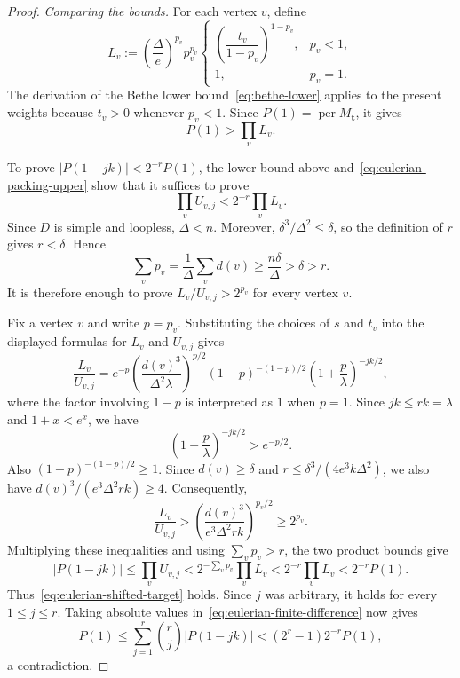 \documentclass[10pt,a4paper]{amsart}
\newcommand{\per}{\operatorname{per}}
\begin{document}
\begin{proof}
\medskip\noindent
\emph{Comparing the bounds.}
For each vertex $v$, define
\[
  L_v:=
  \left(\frac{\Delta}{e}\right)^{p_v}p_v^{p_v}
  \begin{cases}
    \left(\dfrac{t_v}{1-p_v}\right)^{1-p_v},&p_v<1,\\[1.2ex]
    1,&p_v=1.
  \end{cases}
\]
The derivation of the Bethe lower bound~\eqref{eq:bethe-lower} applies
to the present weights because $t_v>0$ whenever $p_v<1$.  Since
$P(1)=\per M_{\mathbf t}$, it gives
\[
  P(1)>\prod_vL_v.
\]

To prove $|P(1-jk)|<2^{-r}P(1)$, the lower bound above
and~\eqref{eq:eulerian-packing-upper} show that it suffices to prove
\[
  \prod_vU_{v,j}<2^{-r}\prod_vL_v.
\]
Since $D$ is simple and loopless, $\Delta<n$.  Moreover,
$\delta^3/\Delta^2\le\delta$, so the definition of $r$ gives
$r<\delta$.  Hence
\[
  \sum_vp_v
  =\frac{1}{\Delta}\sum_vd(v)
  \ge\frac{n\delta}{\Delta}
  >\delta
  >r.
\]
It is therefore enough to prove
$L_v/U_{v,j}>2^{p_v}$ for every vertex $v$.

Fix a vertex $v$ and write $p=p_v$.  Substituting the choices of $s$
and $t_v$ into the displayed formulas for $L_v$ and $U_{v,j}$ gives
\[
  \frac{L_v}{U_{v,j}}
  =e^{-p}
  \left(\frac{d(v)^3}{\Delta^2\lambda}\right)^{p/2}
  (1-p)^{-(1-p)/2}
  \left(1+\frac p\lambda\right)^{-jk/2},
\]
where the factor involving $1-p$ is interpreted as $1$ when $p=1$.
Since $jk\le rk=\lambda$ and $1+x<e^x$, we have
\[
  \left(1+\frac p\lambda\right)^{-jk/2}>e^{-p/2}.
\]
Also $(1-p)^{-(1-p)/2}\ge1$.  Since $d(v)\ge\delta$ and
$r\le\delta^3/(4e^3k\Delta^2)$, we also have
$d(v)^3/(e^3\Delta^2rk)\ge4$.  Consequently,
\[
  \frac{L_v}{U_{v,j}}
  >\left(\frac{d(v)^3}{e^3\Delta^2rk}\right)^{p_v/2}
  \ge2^{p_v}.
\]
Multiplying these inequalities and using $\sum_vp_v>r$, the two product
bounds give
\[
  |P(1-jk)|
  \le\prod_vU_{v,j}
  <2^{-\sum_vp_v}\prod_vL_v
  <2^{-r}\prod_vL_v
  <2^{-r}P(1).
\]
Thus~\eqref{eq:eulerian-shifted-target} holds.  Since $j$ was
arbitrary, it holds for every $1\le j\le r$.  Taking absolute values
in~\eqref{eq:eulerian-finite-difference} now gives
\[
  P(1)
  \le\sum_{j=1}^r\binom rj|P(1-jk)|
  <(2^r-1)2^{-r}P(1),
\]
a contradiction.
\end{proof}
\end{document}
